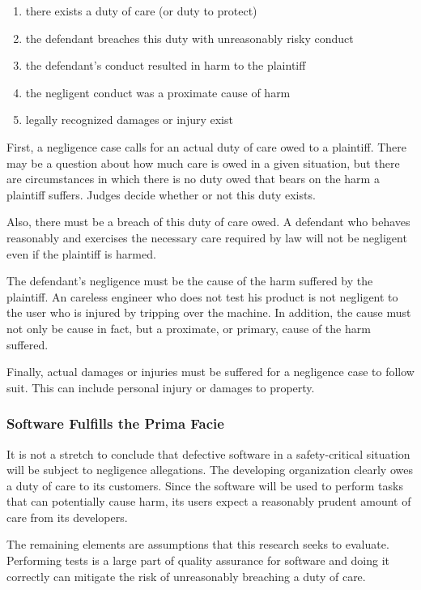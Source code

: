 \singlespace
\begin{enumerate}
 \item there exists a duty of care (or duty to protect)
 \item the defendant breaches this duty with unreasonably risky conduct
 \item the defendant's conduct resulted in harm to the plaintiff
 \item the negligent conduct was a proximate cause of harm
 \item legally recognized damages or injury exist
\end{enumerate}
\doublespace

First, a negligence case calls for an actual duty of care owed to a plaintiff.
There may be a question about how much care is owed in a given situation, but
there are circumstances in which there is no duty owed that bears on the harm a
plaintiff suffers. Judges decide whether or not this duty exists.

Also, there must be a breach of this duty of care owed. A defendant who behaves
reasonably and exercises the necessary care required by law will not be
negligent even if the plaintiff is harmed.

The defendant's negligence must be the cause of the harm suffered by the
plaintiff. An careless engineer who does not test his product is not negligent
to the user who is injured by tripping over the machine. In addition, the cause
must not only be cause in fact, but a proximate, or primary, cause of the harm
suffered.

Finally, actual damages or injuries must be suffered for a negligence case to
follow suit. This can include personal injury or damages to property.

\subsubsection{Software Fulfills the Prima Facie}

It is not a stretch to conclude that defective software in a safety-critical
situation will be subject to negligence allegations. The developing
organization clearly owes a duty of care to its customers. Since the software
will be used to perform tasks that can potentially cause harm, its users expect
a reasonably prudent amount of care from its developers.

The remaining elements are assumptions that this research seeks to evaluate.
Performing tests is a large part of quality assurance for software and doing it
correctly can mitigate the risk of unreasonably breaching a duty of care.
